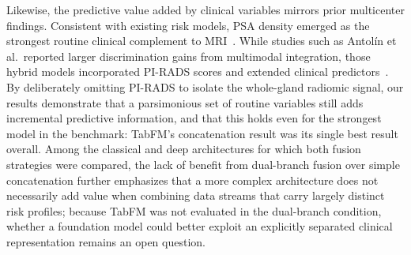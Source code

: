\documentclass[11pt]{article}
\begin{document}
Likewise, the predictive value added by clinical variables mirrors prior multicenter findings.
Consistent with existing risk models, PSA density emerged as the strongest routine clinical
complement to MRI~\citep{RadiomicsMultisite2023,RadiomicsNomogram2022}. While studies such as
Antol{\'i}n et al.\ reported larger discrimination gains from multimodal integration, those hybrid
models incorporated PI-RADS scores and extended clinical predictors~\citep{Antolin2026Insights}.
By deliberately omitting PI-RADS to isolate the whole-gland radiomic signal, our results
demonstrate that a parsimonious set of routine variables still adds incremental
predictive information, and that this holds even for the strongest model in the
benchmark: TabFM's concatenation result was its single best result overall.
Among the classical and deep architectures for which both fusion strategies
were compared, the lack of benefit from dual-branch fusion over simple
concatenation further emphasizes that a more complex architecture does not
necessarily add value when combining data streams that carry largely distinct
risk profiles; because TabFM was not evaluated in the dual-branch condition,
whether a foundation model could better exploit an explicitly separated
clinical representation remains an open question.
\end{document}
